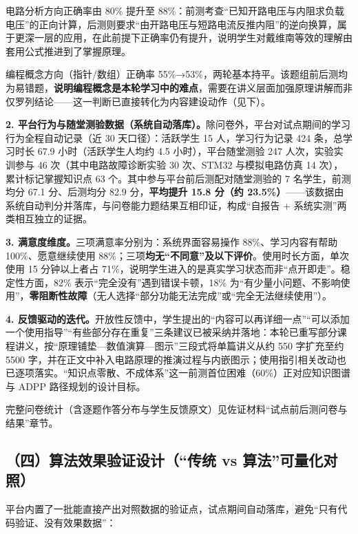 \documentclass[zihao=-4,a4paper,UTF8,fontset=windows]{ctexart}
\begin{document}
电路分析方向正确率由 80\% 提升至 88\%：前测考查“已知开路电压与内阻求负载电压”的正向计算，后测则要求“由开路电压与短路电流反推内阻”的逆向换算，属于更深一层的应用，在此前提下正确率仍有提升，说明学生对戴维南等效的理解由套用公式推进到了掌握原理。

编程概念方向（指针/数组）正确率 55\%→53\%，两轮基本持平。该题组前后测均为易错题，\textbf{说明编程概念是本轮学习中的难点}，需要在讲义层面加强原理讲解而非仅罗列结论——这一判断已直接转化为内容建设动作（见下）。

\textbf{2. 平台行为与随堂测验数据（系统自动落库）。}除问卷外，平台对试点期间的学习行为全程自动记录（近 30 天口径）：活跃学生 15 人，学习行为记录 424 条，总学习时长 67.9 小时（活跃学生人均约 4.5 小时），平台随堂测验 247 人次，实验实训参与 46 次（其中电路故障诊断实验 30 次、STM32 与模拟电路仿真 14 次），累计标记掌握知识点 63 个。其中参与平台前后测配对随堂测验的 7 名学生，前测均分 67.1 分、后测均分 82.9 分，\textbf{平均提升 15.8 分（约 23.5\%）}——该数据由系统自动判分并落库，与问卷能力题结果互相印证，构成“自报告 + 系统实测”两类相互独立的证据。

\textbf{3. 满意度维度。}三项满意率分别为：系统界面容易操作 88\%、学习内容有帮助 100\%、愿意继续使用 88\%；三项\textbf{均无“不同意”及以下评价}。使用时长方面，单次使用 15 分钟以上者占 71\%，说明学生进入的是真实学习状态而非“点开即走”。稳定性方面，82\% 表示“完全没有”遇到错误卡顿，18\% 为“有少量小问题、不影响使用”，\textbf{零阻断性故障}（无人选择“部分功能无法完成”或“完全无法继续使用”）。

\textbf{4. 反馈驱动的迭代。}开放性反馈中，学生提出的“内容可以再详细一点”“可以添加一个使用指导”“有些部分存在重复”三条建议已被采纳并落地：本轮已重写部分课程讲义，按“原理铺垫—数值演算—图示”三段式将单篇讲义从约 550 字扩充至约 5500 字，并在正文中补入电路原理的推演过程与内嵌图示；使用指引相关改动也已逐项落实。“知识点零散、不成体系”这一前测首位困难（60\%）正对应知识图谱与 ADPP 路径规划的设计目标。

完整问卷统计（含逐题作答分布与学生反馈原文）见佐证材料“试点前后测问卷与结果”章节。

\subsection{（四）算法效果验证设计（“传统 vs 算法”可量化对照）}


平台内置了一批能直接产出对照数据的验证点，试点期间自动落库，避免“只有代码验证、没有效果数据”：
\end{document}
